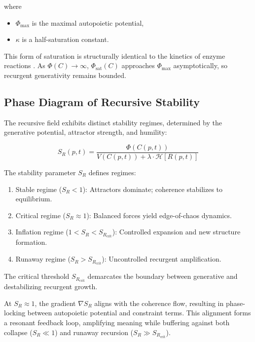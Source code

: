 where

\begin{itemize}
    \item \(\Phi_{\text{max}}\) is the maximal autopoietic potential,
    \item \(\kappa\) is a half-saturation constant.
\end{itemize}

This form of saturation is structurally identical to the kinetics of enzyme reactions \autocite{MichaelisMenten1913}. As \(\Phi(C) \to \infty\), \(\Phi_{\text{sat}}(C)\) approaches \(\Phi_{\text{max}}\) asymptotically, so recurgent generativity remains bounded.

\subsection{Phase Diagram of Recursive Stability}

The recursive field exhibits distinct stability regimes, determined by the generative potential, attractor strength, and humility:

\begin{equation}
S_R(p,t) = \frac{\Phi(C(p,t))}{V(C(p,t)) + \lambda \cdot \mathcal{H}[R(p,t)]}
\end{equation}

The stability parameter \(S_R\) defines regimes:

\begin{enumerate}
    \item Stable regime (\(S_R < 1\)): Attractors dominate; coherence stabilizes to equilibrium.
    \item Critical regime (\(S_R \approx 1\)): Balanced forces yield edge-of-chaos dynamics.
    \item Inflation regime (\(1 < S_R < S_{R_{\text{crit}}}\)): Controlled expansion and new structure formation.
    \item Runaway regime (\(S_R > S_{R_{\text{crit}}}\)): Uncontrolled recurgent amplification.
\end{enumerate}

The critical threshold \(S_{R_{\text{crit}}}\) demarcates the boundary between generative and destabilizing recurgent growth.

At \(S_R \approx 1\), the gradient \(\nabla S_R\) aligns with the coherence flow, resulting in phase-locking between autopoietic potential and constraint terms. This alignment forms a resonant feedback loop, amplifying meaning while buffering against both collapse (\(S_R \ll 1\)) and runaway recursion (\(S_R \gg S_{R_{\text{crit}}}\)).


